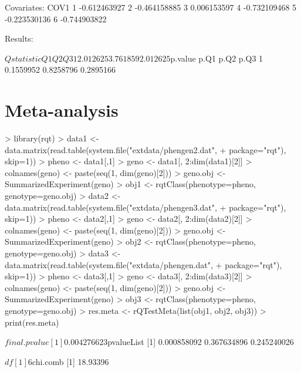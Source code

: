 \documentclass{article}
\begin{document}
\begin{Schunk}
\begin{Soutput}
Covariates:
          COV1
1 -0.612463927
2 -0.464158885
3  0.006153597
4 -0.732109468
5 -0.223530136
6 -0.744903822


Results:

$Qstatistic
        Q1       Q2       Q3
1 2.012625 3.761859 2.012625

$p.value
       p.Q1      p.Q2      p.Q3
1 0.1559952 0.8258796 0.2895166
\end{Soutput}
\end{Schunk}


\section{Meta-analysis}

\begin{Schunk}
\begin{Sinput}
> library(rqt)
> data1 <- data.matrix(read.table(system.file("extdata/phengen2.dat",
+                                             package="rqt"), skip=1))
> pheno <- data1[,1]
> geno <- data1[, 2:dim(data1)[2]]
> colnames(geno) <- paste(seq(1, dim(geno)[2]))
> geno.obj <- SummarizedExperiment(geno)
> obj1 <- rqtClass(phenotype=pheno, genotype=geno.obj)
> data2 <- data.matrix(read.table(system.file("extdata/phengen3.dat",
+                                             package="rqt"), skip=1))
> pheno <- data2[,1]
> geno <- data2[, 2:dim(data2)[2]]
> colnames(geno) <- paste(seq(1, dim(geno)[2]))
> geno.obj <- SummarizedExperiment(geno)
> obj2 <- rqtClass(phenotype=pheno, genotype=geno.obj)
> data3 <- data.matrix(read.table(system.file("extdata/phengen.dat",
+                                             package="rqt"), skip=1))
> pheno <- data3[,1]
> geno <- data3[, 2:dim(data3)[2]]
> colnames(geno) <- paste(seq(1, dim(geno)[2]))
> geno.obj <- SummarizedExperiment(geno)
> obj3 <- rqtClass(phenotype=pheno, genotype=geno.obj)
> res.meta <- rQTestMeta(list(obj1, obj2, obj3))
> print(res.meta)
\end{Sinput}
\begin{Soutput}
$final.pvalue
[1] 0.004276623

$pvalueList
[1] 0.000858092 0.367634896 0.245240026

$df
[1] 6

$chi.comb
[1] 18.93396
\end{Soutput}
\end{Schunk}
\end{document}
